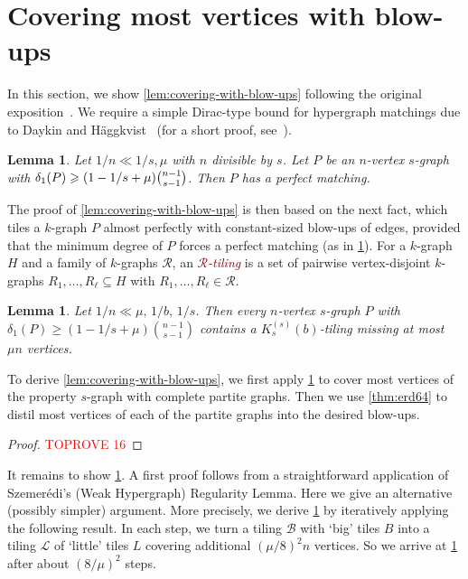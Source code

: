 \documentclass[12pt,reqno]{amsart}
\theoremstyle{plain}
\newtheorem{lemma}[theorem]{Lemma}
\theoremstyle{definition}
\numberwithin{equation}{section}
\renewcommand{\geq}{\geqslant}
\renewcommand{\subset}{\subseteq}
\newcommand{\defn}[1]{\textcolor{Maroon}{\emph{#1}}}
\newcommand{\cB}{\mathcal{B}}
\newcommand{\cL}{\mathcal{L}}
\newcommand{\cR}{\mathcal{R}}
\begin{document}
	\appendix
	
	\section{Covering most vertices with blow-ups}\label{lem:almost-blow-up-cover}
	
	In this section, we show \cref{lem:covering-with-blow-ups} following the original exposition~\cite[Lemma~4.4]{lang2023tiling}.
	We require a simple Dirac-type bound for hypergraph matchings due to Daykin and H\"{a}ggkvist~\cite{DH81} (for a short proof, see~\cite[Lemma~B.2]{langsanhueza2024dirac}).
	
	\begin{lemma}\label{lem:matching}
		Let $ 1/n \ll 1/s, \mu$ with $n$ divisible by $s$.
		Let $P$ be an $n$-vertex $s$-graph with $\delta_1(P) \geq (1 - 1/s + \mu) \tbinom{n-1}{s-1}$.
		Then $P$ has a perfect matching.
	\end{lemma}
	
	The proof of \cref{lem:covering-with-blow-ups} is then based on the next fact, which tiles a $k$-graph $P$ almost perfectly with constant-sized blow-ups of edges, provided that the minimum degree of $P$ forces a perfect matching (as in \cref{lem:matching}).
	For a $k$-graph $H$ and a family of $k$-graphs $\cR$, an \defn{$\cR$-tiling} is a set of pairwise vertex-disjoint $k$-graphs $R_1,\dots,R_\ell \subset H$ with $R_1,\dots,R_\ell \in \cR$.
	
	\begin{lemma}\label{lem:blow-up-matching}
		Let $1/n \ll \mu,\, 1/b,\, 1/s$.
		Then every $n$-vertex $s$-graph $P$ with $\delta_1(P) \geq (1-1/s+\mu) \binom{n-1}{s-1}$ contains a $K_s^{(s)}(b)$-tiling missing at most $\mu n$ vertices.
	\end{lemma}
	
	To derive \cref{lem:covering-with-blow-ups}, we first apply \cref{lem:blow-up-matching} to cover most vertices of the property $s$-graph with complete partite graphs.
	Then we use \cref{thm:erd64} to distil most vertices of each of the partite graphs into the desired blow-ups.
	
	\begin{proof}\textcolor{red}{TOPROVE 16}\end{proof}
	
	It remains to show \cref{lem:blow-up-matching}.
	A first proof follows from a straightforward application of Szemerédi's (Weak Hypergraph) Regularity Lemma.
	Here we give an alternative (possibly simpler) argument.
	More precisely, we derive \cref{lem:blow-up-matching} by iteratively applying the following result.
	In each step, we turn a tiling $\cB$ with `big' tiles $B$ into a tiling $\cL$ of `little' tiles $L$ covering additional $(\mu/8)^2n$ vertices.
	So we arrive at \cref{lem:blow-up-matching} after about $(8/\mu)^2$ steps.
	
\end{document}
